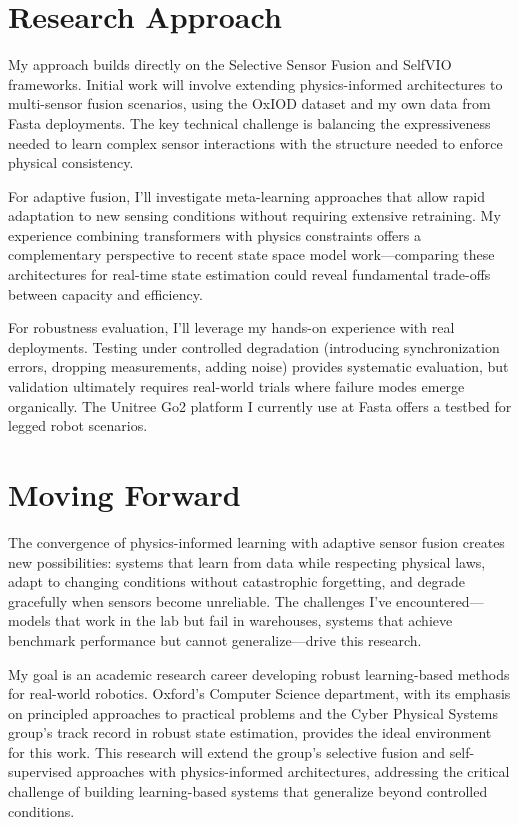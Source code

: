 \documentclass[12pt]{article}
\begin{document}
\section*{Research Approach}

My approach builds directly on the Selective Sensor Fusion and SelfVIO frameworks. Initial work will involve extending physics-informed architectures to multi-sensor fusion scenarios, using the OxIOD dataset and my own data from Fasta deployments. The key technical challenge is balancing the expressiveness needed to learn complex sensor interactions with the structure needed to enforce physical consistency.

For adaptive fusion, I'll investigate meta-learning approaches that allow rapid adaptation to new sensing conditions without requiring extensive retraining. My experience combining transformers with physics constraints offers a complementary perspective to recent state space model work—comparing these architectures for real-time state estimation could reveal fundamental trade-offs between capacity and efficiency.

For robustness evaluation, I'll leverage my hands-on experience with real deployments. Testing under controlled degradation (introducing synchronization errors, dropping measurements, adding noise) provides systematic evaluation, but validation ultimately requires real-world trials where failure modes emerge organically. The Unitree Go2 platform I currently use at Fasta offers a testbed for legged robot scenarios.

\section*{Moving Forward}

The convergence of physics-informed learning with adaptive sensor fusion creates new possibilities: systems that learn from data while respecting physical laws, adapt to changing conditions without catastrophic forgetting, and degrade gracefully when sensors become unreliable. The challenges I've encountered—models that work in the lab but fail in warehouses, systems that achieve benchmark performance but cannot generalize—drive this research.

My goal is an academic research career developing robust learning-based methods for real-world robotics. Oxford's Computer Science department, with its emphasis on principled approaches to practical problems and the Cyber Physical Systems group's track record in robust state estimation, provides the ideal environment for this work. This research will extend the group's selective fusion and self-supervised approaches with physics-informed architectures, addressing the critical challenge of building learning-based systems that generalize beyond controlled conditions.
\end{document}

